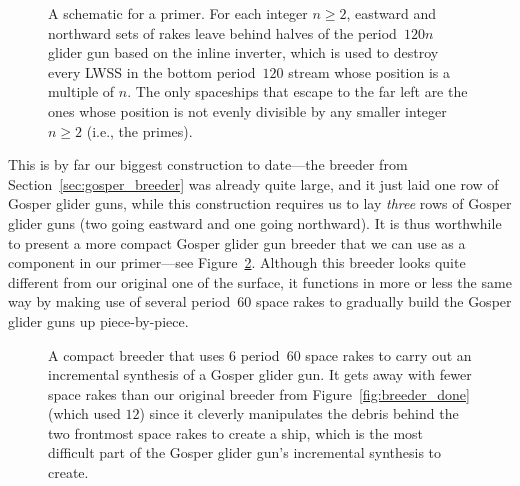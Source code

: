 \begin{figure}[!htb]
	\caption{A schematic for a primer. For each integer $n \geq 2$, eastward and northward sets of rakes leave behind halves of the period~$120n$ glider gun based on the inline inverter, which is used to destroy every LWSS in the bottom period~$120$ stream whose position is a multiple of $n$. The only spaceships that escape to the far left are the ones whose position is not evenly divisible by any smaller integer $n \geq 2$ (i.e., the primes).}
	\label{fig:primer_schematic}
\end{figure}

This is by far our biggest construction to date---the breeder from Section~\ref{sec:gosper_breeder} was already quite large, and it just laid one row of Gosper glider guns, while this construction requires us to lay \emph{three} rows of Gosper glider guns (two going eastward and one going northward). It is thus worthwhile to present a more compact Gosper glider gun breeder that we can use as a component in our primer---see Figure~\ref{fig:breeder_compact}. Although this breeder looks quite different from our original one of the surface, it functions in more or less the same way by making use of several period~$60$ space rakes to gradually build the Gosper glider guns up piece-by-piece.

\begin{figure}[!htb]
	\centering
	\caption{A compact breeder that uses $6$ period~$60$ space rakes to carry out an incremental synthesis of a Gosper glider gun. It gets away with fewer space rakes than our original breeder from Figure~\ref{fig:breeder_done} (which used $12$) since it cleverly manipulates the debris behind the two frontmost space rakes to create a ship, which is the most difficult part of the Gosper glider gun's incremental synthesis to create.}
	\label{fig:breeder_compact}
\end{figure}


